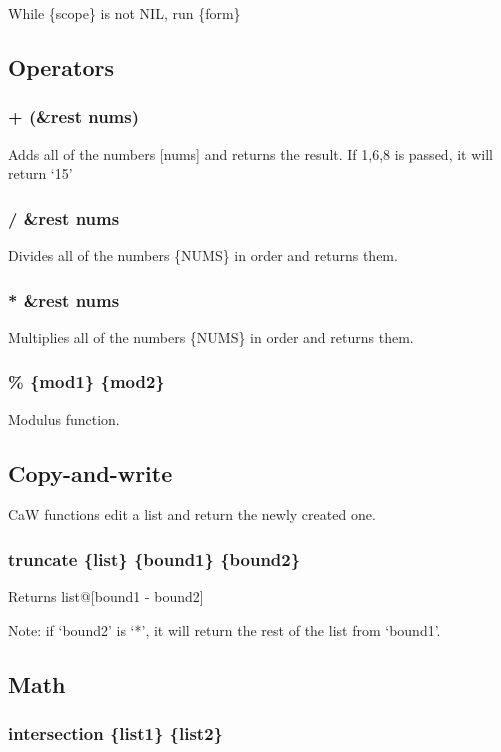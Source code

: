 \documentclass{article}
\begin{document}
	While \{scope\} is not NIL, run \{form\}
	\subsection{Operators}
	
	\subsubsection{+ (\&rest nums)}
	
	Adds all of the numbers [nums] and returns the result. If {1,6,8} is passed, it will return `15'
	
	\subsubsection{/ \&rest nums}
	
	Divides all of the numbers \{NUMS\} in order and returns them.
	
	\subsubsection{* \&rest nums}
	
	Multiplies all of the numbers \{NUMS\} in order and returns them.
	
	\subsubsection{\% \{mod1\} \{mod2\}}
	
	Modulus function.
	\newpage
	\subsection{Copy-and-write}
	
	CaW functions edit a list and return the newly created one.
	
	\subsubsection{truncate \{list\} \{bound1\} \{bound2\}}
	
	Returns list@[bound1 - bound2]
	
	Note: if `bound2' is `*', it will return the rest of the list from `bound1'.
	\newpage
	\subsection{Math}
	
	\subsubsection{intersection \{list1\} \{list2\}}
	
\end{document}
